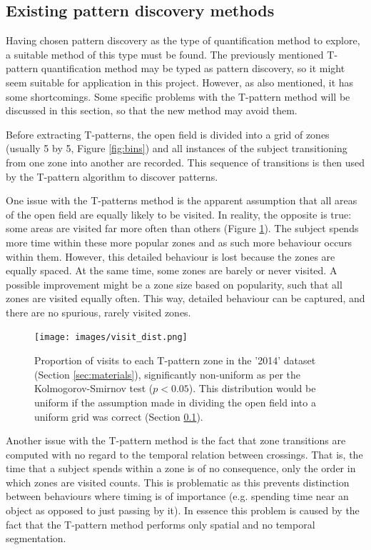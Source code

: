 \documentclass[conference,a4paper,twoside]{IEEEtran}
\begin{document}
\subsection{Existing pattern discovery methods}
\label{sec:bg_tpat}
Having chosen pattern discovery as the type of quantification method to explore, a suitable method of this type must be found. The previously mentioned T-pattern quantification method may be typed as pattern discovery, so it might seem suitable for application in this project. However, as also mentioned, it has some shortcomings. Some specific problems with the T-pattern method will be discussed in this section, so that the new method may avoid them.

Before extracting T-patterns, the open field is divided into a grid of zones (usually 5 by 5, Figure \ref{fig:bins}) and all instances of the subject transitioning from one zone into another are recorded. This sequence of transitions is then used by the T-pattern algorithm to discover patterns.

One issue with the T-patterns method is the apparent assumption that all areas of the open field are equally likely to be visited. In reality, the opposite is true: some areas are visited far more often than others (Figure \ref{fig:visit_dist}). The subject spends more time within these more popular zones and as such more behaviour occurs within them. However, this detailed behaviour is lost because the zones are equally spaced. At the same time, some zones are barely or never visited. A possible improvement might be a zone size based on popularity, such that all zones are visited equally often. This way, detailed behaviour can be captured, and there are no spurious, rarely visited zones.

\begin{figure}
    \centering
    \texttt{[image: images/visit\_dist.png]}
    \caption{Proportion of visits to each T-pattern zone in the '2014' dataset (Section \ref{sec:materials}), significantly non-uniform as per the Kolmogorov-Smirnov test ($p < 0.05$). This distribution would be uniform if the assumption made in dividing the open field into a uniform grid was correct (Section \ref{sec:bg_tpat}).}
    \label{fig:visit_dist}
\end{figure}

Another issue with the T-pattern method is the fact that zone transitions are computed with no regard to the temporal relation between crossings. That is, the time that a subject spends within a zone is of no consequence, only the order in which zones are visited counts. This is problematic as this prevents distinction between behaviours where timing is of importance (e.g. spending time near an object as opposed to just passing by it). In essence this problem is caused by the fact that the T-pattern method performs only spatial and no temporal segmentation.
\end{document}
